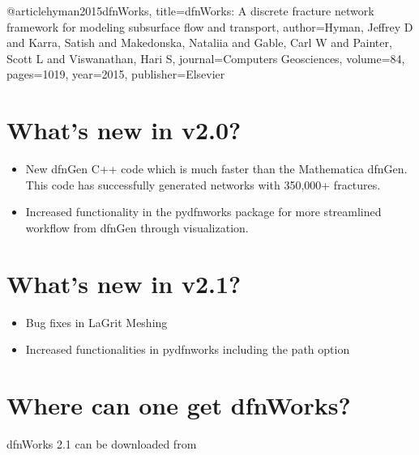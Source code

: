 \documentclass[letterpaper,10pt,english]{sphinxmanual}
\begin{document}

%
\begin{sphinxVerbatim}[commandchars=\\\{\}]
  @article\PYGZob{}hyman2015dfnWorks,
    title=\PYGZob{}dfnWorks: A discrete fracture network framework
for modeling subsurface flow and transport\PYGZcb{},
    author=\PYGZob{}Hyman, Jeffrey D and Karra, Satish and Makedonska,
Nataliia and Gable, Carl W and Painter, Scott L
and Viswanathan, Hari S\PYGZcb{},
    journal=\PYGZob{}Computers \PYGZbs{}\PYGZam{} Geosciences\PYGZcb{},
    volume=\PYGZob{}84\PYGZcb{},
    pages=\PYGZob{}10\PYGZhy{}\PYGZhy{}19\PYGZcb{},
    year=\PYGZob{}2015\PYGZcb{},
    publisher=\PYGZob{}Elsevier\PYGZcb{}
  \PYGZcb{}
\end{sphinxVerbatim}


\section{What’s new in v2.0?}
\label{\detokenize{intro:what-s-new-in-v2-0}}\begin{itemize}
\item {} 
New dfnGen C++ code which is much faster than the Mathematica dfnGen. This code has successfully generated networks with 350,000+ fractures.

\item {} 
Increased functionality in the pydfnworks package for more streamlined workflow from dfnGen through visualization.

\end{itemize}


\section{What’s new in v2.1?}
\label{\detokenize{intro:what-s-new-in-v2-1}}\begin{itemize}
\item {} 
Bug fixes in LaGrit Meshing

\item {} 
Increased functionalities in pydfnworks including the path option

\end{itemize}


\section{Where can one get dfnWorks?}
\label{\detokenize{intro:where-can-one-get-dfnworks}}
dfnWorks 2.1 can be downloaded from 
\end{document}
